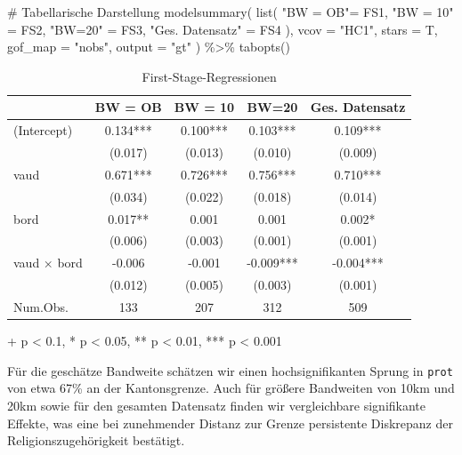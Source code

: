 \documentclass[
  a4paper,
  DIV=11,
  oneside]{scrreprt}
\newenvironment{Shaded}{\begin{snugshade}}{\end{snugshade}}
\newcommand{\AttributeTok}[1]{\textcolor[rgb]{0.40,0.45,0.13}{#1}}
\newcommand{\CommentTok}[1]{\textcolor[rgb]{0.37,0.37,0.37}{#1}}
\newcommand{\FunctionTok}[1]{\textcolor[rgb]{0.28,0.35,0.67}{#1}}
\newcommand{\NormalTok}[1]{\textcolor[rgb]{0.00,0.23,0.31}{#1}}
\newcommand{\OtherTok}[1]{\textcolor[rgb]{0.00,0.23,0.31}{#1}}
\newcommand{\SpecialCharTok}[1]{\textcolor[rgb]{0.37,0.37,0.37}{#1}}
\newcommand{\StringTok}[1]{\textcolor[rgb]{0.13,0.47,0.30}{#1}}
\begin{document}
\begin{Shaded}
\begin{Highlighting}[]
\CommentTok{\# Tabellarische Darstellung}
\FunctionTok{modelsummary}\NormalTok{(}
  \FunctionTok{list}\NormalTok{(}
    \StringTok{"BW = OB"}\OtherTok{=}\NormalTok{ FS1, }
    \StringTok{"BW = 10"} \OtherTok{=}\NormalTok{ FS2, }
    \StringTok{"BW=20"} \OtherTok{=}\NormalTok{ FS3, }
    \StringTok{"Ges. Datensatz"} \OtherTok{=}\NormalTok{ FS4}
\NormalTok{  ), }
  \AttributeTok{vcov =} \StringTok{"HC1"}\NormalTok{, }
  \AttributeTok{stars =}\NormalTok{ T, }
  \AttributeTok{gof\_map =} \StringTok{"nobs"}\NormalTok{, }
  \AttributeTok{output =} \StringTok{"gt"}
\NormalTok{) }\SpecialCharTok{\%\textgreater{}\%}
  \FunctionTok{tabopts}\NormalTok{()}
\end{Highlighting}
\end{Shaded}

\setlength{\LTpost}{0mm}

\begin{longtable}{lcccc}

\caption{\label{tbl-BastenBetzFS}First-Stage-Regressionen}

\tabularnewline

\toprule
  & BW = OB & BW = 10 & BW=20 & Ges. Datensatz \\ 
\midrule\addlinespace[2.5pt]
(Intercept) & 0.134*** & 0.100*** & 0.103*** & 0.109*** \\ 
 & (0.017) & (0.013) & (0.010) & (0.009) \\ 
vaud & 0.671*** & 0.726*** & 0.756*** & 0.710*** \\ 
 & (0.034) & (0.022) & (0.018) & (0.014) \\ 
bord & 0.017** & 0.001 & 0.001 & 0.002* \\ 
 & (0.006) & (0.003) & (0.001) & (0.001) \\ 
vaud × bord & -0.006 & -0.001 & -0.009*** & -0.004*** \\ 
 & (0.012) & (0.005) & (0.003) & (0.001) \\ 
Num.Obs. & 133 & 207 & 312 & 509 \\ 
\bottomrule

\end{longtable}

\begin{minipage}{\linewidth}
+ p < 0.1, * p < 0.05, ** p < 0.01, *** p < 0.001\\
\end{minipage}

Für die geschätze Bandweite schätzen wir einen hochsignifikanten Sprung
in \texttt{prot} von etwa 67\% an der Kantonsgrenze. Auch für größere
Bandweiten von 10km und 20km sowie für den gesamten Datensatz finden wir
vergleichbare signifikante Effekte, was eine bei zunehmender Distanz zur
Grenze persistente Diskrepanz der Religionszugehörigkeit bestätigt.
\end{document}
